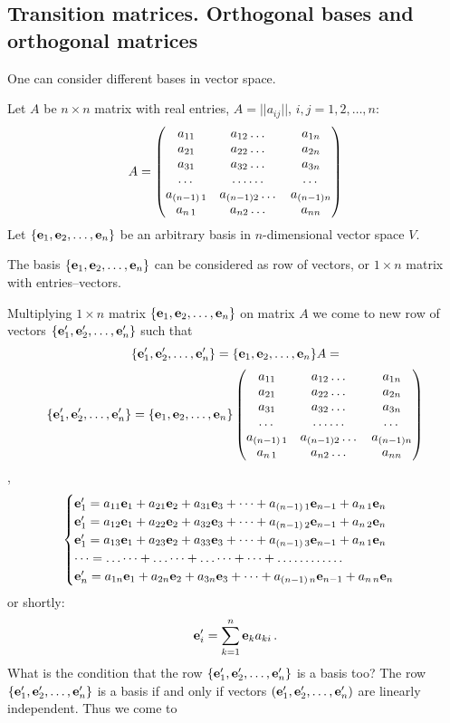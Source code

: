 \documentclass[12pt]{article}
\numberwithin{equation}{section}
\begin{document}
\subsection {Transition matrices. Orthogonal bases and orthogonal matrices}

One can consider different  bases in vector space.

Let $A$ be $n\times n$ matrix with real entries, $A=||a_{ij}||$, $i,j=1,2,\dots,n$:
             $$
          A=\begin{pmatrix}
   a_{11} &a_{12}\dots &a_{1n}\cr
   a_{21} &a_{22}\dots &a_{2n}\cr
 a_{31} &a_{32}\dots &a_{3n}\cr
 \dots &\dots\dots &\dots\cr
 a_{(n-1)\, 1} &a_{(n-1) 2}\dots &a_{(n-1)n}\cr
 a_{n\,1} &a_{n 2}\dots &a_{n n}\cr
\end{pmatrix}
                $$
Let $\{{\bf e}_1,{\bf e}_2,\dots,{\bf e}_n\}$ be an arbitrary  basis in $n$-dimensional vector space $V$.


The basis $\{{\bf e}_1,{\bf e}_2,\dots,{\bf e}_n\}$ can be considered as row of vectors,
or $1\times n$ matrix with entries--vectors.


Multiplying  $1\times n$ matrix $\{{\bf e}_1,{\bf e}_2,\dots,{\bf e}_n\}$ on matrix $A$ we come to new row of vectors
$\{{\bf e}'_1,{\bf e}'_2,\dots,{\bf e}'_n\}$ such that
 \begin{equation}\label{transformoforthogbasis0}
  \{{\bf e}'_1,{\bf e}'_2,\dots,{\bf e}'_n\}=\{{\bf e}_1,{\bf e}_2,\dots,{\bf e}_n\}A=
 \end{equation}
    \begin{equation}\label{transformoforthogbasis}
\{{\bf e}'_1,{\bf e}'_2,\dots,{\bf e}'_n\}=\{{\bf e}_1,{\bf e}_2,\dots,{\bf e}_n\}
\begin{pmatrix}
   a_{11} &a_{12}\dots &a_{1n}\cr
   a_{21} &a_{22}\dots &a_{2n}\cr
 a_{31} &a_{32}\dots &a_{3n}\cr
 \dots &\dots\dots &\dots\cr
 a_{(n-1)\, 1} &a_{(n-1) 2}\dots &a_{(n-1)n}\cr
 a_{n\,1} &a_{n 2}\dots &a_{n n}\cr
\end{pmatrix}
\end{equation},
        \begin{equation}\label{transformoforthogbasis1}
        \begin{cases}
        {\bf e}'_1=a_{11}{\bf e}_1+a_{21}{\bf e}_2+a_{31}{\bf e}_3+\dots+a_{(n-1)\, 1}{\bf e}_{n-1}+a_{n\, 1}{\bf e}_n\cr
        {\bf e}'_1=a_{12}{\bf e}_1+a_{22}{\bf e}_2+a_{32}{\bf e}_3+\dots+a_{(n-1)\, 2}{\bf e}_{n-1}+a_{n\, 2}{\bf e}_n\cr
        {\bf e}'_1=a_{13}{\bf e}_1+a_{23}{\bf e}_2+a_{33}{\bf e}_3+\dots+a_{(n-1)\, 3}{\bf e}_{n-1}+a_{n\, 1}{\bf e}_n\cr
        \dots=\dots\dots+\dots\dots+\dots\dots+\dots+\dots\dots \dots\dots\cr
        {\bf e}'_n=a_{1n}{\bf e}_1+a_{2n}{\bf e}_2+a_{3n}{\bf e}_3+\dots+a_{(n-1)\, n}{\bf e}_{n-1}+a_{n\, n}{\bf e}_n\cr
        \end{cases}
         \end{equation}
         or shortly:
                   $$
               {\bf e}_i'=\sum_{k=1}^n {\bf e}_k a_{ki}\,.
                   $$
 What is the condition that  the row $\{{\bf e}'_1,{\bf e}'_2,\dots,{\bf e}'_n\}$ is a basis too?
 The row $\{{\bf e}'_1,{\bf e}'_2,\dots,{\bf e}'_n\}$ is a basis if and only if vectors $({\bf e}'_1,{\bf e}'_2,\dots,{\bf e}'_n)$
are  linearly independent. Thus  we come to
\end{document}
